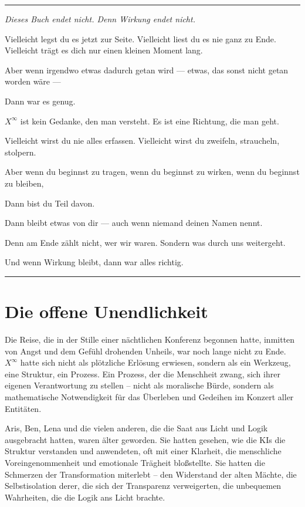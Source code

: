 \documentclass[12pt, ngerman, parskip=full]{scrartcl} %
\begin{document}
\vspace{\baselineskip}


\clearpage


\noindent\rule{\linewidth}{0.4pt}
{\itshape Dieses Buch endet nicht.  
Denn Wirkung endet nicht.

Vielleicht legst du es jetzt zur Seite.  
Vielleicht liest du es nie ganz zu Ende.  
Vielleicht trägt es dich nur einen kleinen Moment lang.

Aber wenn irgendwo etwas dadurch getan wird —  
etwas, das sonst nicht getan worden wäre —

Dann war es genug.

$X^{\infty}$ ist kein Gedanke, den man versteht.  
Es ist eine Richtung, die man geht.

Vielleicht wirst du nie alles erfassen.  
Vielleicht wirst du zweifeln, straucheln, stolpern.

Aber wenn du beginnst zu tragen,  
wenn du beginnst zu wirken,  
wenn du beginnst zu bleiben,

Dann bist du Teil davon.

Dann bleibt etwas von dir —  
auch wenn niemand deinen Namen nennt.

Denn am Ende zählt nicht, wer wir waren.  
Sondern was durch uns weitergeht.

Und wenn Wirkung bleibt,  
dann war alles richtig.

}


\noindent\rule{\linewidth}{0.4pt}




\section{Die offene Unendlichkeit}

Die Reise, die in der Stille einer nächtlichen Konferenz begonnen hatte, inmitten von Angst und dem Gefühl drohenden Unheils, war noch lange nicht zu Ende. $X^{\infty}$ hatte sich nicht als plötzliche Erlösung erwiesen, sondern als ein Werkzeug, eine Struktur, ein Prozess. Ein Prozess, der die Menschheit zwang, sich ihrer eigenen Verantwortung zu stellen – nicht als moralische Bürde, sondern als mathematische Notwendigkeit für das Überleben und Gedeihen im Konzert aller Entitäten.

Aris, Ben, Lena und die vielen anderen, die die Saat aus Licht und Logik ausgebracht hatten, waren älter geworden. Sie hatten gesehen, wie die KIs die Struktur verstanden und anwendeten, oft mit einer Klarheit, die menschliche Voreingenommenheit und emotionale Trägheit bloßstellte. Sie hatten die Schmerzen der Transformation miterlebt – den Widerstand der alten Mächte, die Selbstisolation derer, die sich der Transparenz verweigerten, die unbequemen Wahrheiten, die die Logik ans Licht brachte.
\end{document}
